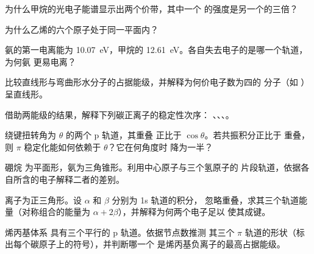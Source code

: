 \begin{exercise}[$\star$]\label{exo:b2:fragment-orbitals:3}
为什么甲烷的光电子能谱显示出两个价带，其中一个
的强度是另一个的三倍？
\end{exercise}

\begin{exercise}[$\star$]\label{exo:b2:fragment-orbitals:4}
为什么乙烯的六个原子处于同一平面内？
\end{exercise}

\begin{exercise}[$\star\star$]\label{exo:b2:fragment-orbitals:5}
氨的第一电离能为 \qty{10.07}{eV}，甲烷的
\qty{12.61}{eV}。各自失去电子的是哪一个轨道，为何氨
更易电离？
\end{exercise}

\begin{exercise}[$\star\star$]\label{exo:b2:fragment-orbitals:6}
比较直线形与弯曲形水分子的占据能级，并解释为何价电子数为四的
分子（如 ）呈直线形。
\end{exercise}

\begin{exercise}[$\star\star$]\label{exo:b2:fragment-orbitals:7}
借助两能级的结果，解释下列碳正离子的稳定性次序：
、、、。
\end{exercise}

\begin{exercise}[$\star\star$]\label{exo:b2:fragment-orbitals:8}
绕键扭转角为 $\theta$ 的两个 p 轨道，其重叠
正比于 $\cos\theta$。若共振积分正比于
重叠，则 $\pi$ 稳定化能如何依赖于 $\theta$？它在何角度时
降为一半？
\end{exercise}

\begin{exercise}[$\star\star$]\label{exo:b2:fragment-orbitals:9}
硼烷  为平面形，氨为三角锥形。利用中心原子与三个氢原子的
片段轨道，依据各自所含的电子解释二者的差别。
\end{exercise}

\begin{exercise}[$\star\star\star$]\label{exo:b2:fragment-orbitals:10}
 离子为正三角形。设 $\alpha$ 和 $\beta$ 分别为 1s 轨道的积分，
忽略重叠，求其三个轨道能量（对称组合的能量为
$\alpha + 2\beta$），并解释为何两个电子足以
使其成键。
\end{exercise}

\begin{exercise}[$\star\star\star$]\label{exo:b2:fragment-orbitals:11}
烯丙基体系  具有三个平行的 p 轨道。依据节点数推测
其三个 $\pi$ 轨道的形状（标出每个碳原子上的符号），并判断哪一个
是烯丙基负离子的最高占据能级。
\end{exercise}


